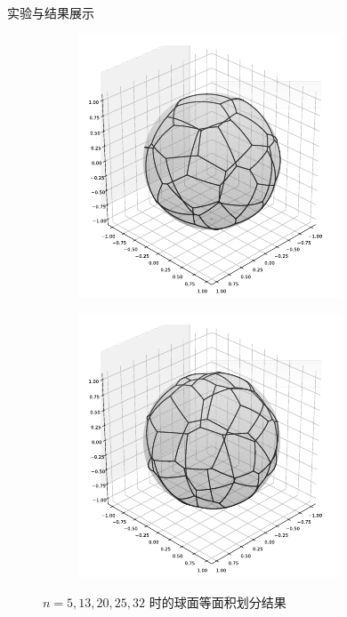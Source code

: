 \documentclass[12pt,aspectratio=169]{beamer}
\begin{document}
\begin{frame}{实验与结果展示}
\begin{figure}[ht]
    \begin{subfigure}[b]{0.2\textwidth}
      \centering
      \includegraphics[width=\linewidth]{fig/4.pdf}
      \label{subfig:4}
    \end{subfigure}
    \hfill
    \begin{subfigure}[b]{0.2\textwidth}
      \centering
      \includegraphics[width=\linewidth]{fig/5.pdf}
      \label{subfig:5}
    \end{subfigure}
  
    \caption{$n=5,13,20,25,32$ 时的球面等面积划分结果}
    \label{fig:sub}
  \end{figure}

\end{frame}
\end{document}

